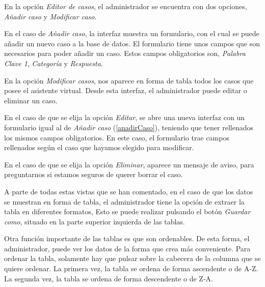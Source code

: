 
En la opción \textit{Editor de casos}, el administrador se encuentra con dos opciones, \textit{Añadir caso} y \textit{Modificar caso}.


\label{anadirCaso}
En el caso de \textit{Añadir caso}, la interfaz muestra un formulario, con el cual se puede añadir un nuevo caso a la base de datos. El formulario tiene unos campos que son necesarios para poder añadir un caso. Estos campos obligatorios son, \textit{Palabra Clave 1}, \textit{Categoría} y \textit{Respuesta}.


En la opción \textit{Modificar casos}, nos aparece en forma de tabla todos los casos que posee el asistente virtual. Desde esta interfaz, el administrador puede editar o eliminar un caso.


En el caso de que se elija la opción \textit{Editar}, se abre una nueva interfaz con un formulario igual al de \textit{Añadir caso} (\ref{anadirCaso}), teniendo que tener rellenados los mismos campos obligatorios. En este caso, el formulario trae campos rellenados según el caso que hayamos elegido para modificar.


En el caso de que se elija la opción \textit{Eliminar}, aparece un mensaje de aviso, para preguntarnos si estamos seguros de querer borrar el caso.


A parte de todas estas vistas que se han comentado, en el caso de que los datos se muestran en forma de tabla, el administrador tiene la opción de extraer la tabla en diferentes formatos, Esto se puede realizar pulsando el botón \textit{Guardar como}, situado en la parte superior izquierda de las tablas.


Otra función importante de las tablas es que son ordenables. De esta forma, el administrador, puede ver los datos de la forma que crea más conveniente. Para ordenar la tabla, solamente hay que pulsar sobre la cabecera de la columna que se quiere ordenar. La primera vez, la tabla se ordena de forma ascendente o de A-Z. La segunda vez, la tabla se ordena de forma descendente o de Z-A.